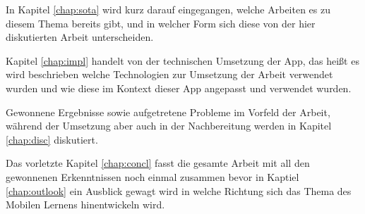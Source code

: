 In Kapitel \ref{chap:sota} wird kurz darauf eingegangen, welche Arbeiten es zu diesem Thema bereits 
gibt, und in welcher Form sich diese von der hier diskutierten Arbeit unterscheiden. 

Kapitel \ref{chap:impl} handelt von der technischen Umsetzung der App, das heißt es wird 
beschrieben welche Technologien zur Umsetzung der Arbeit verwendet wurden und wie diese im 
Kontext dieser App angepasst und verwendet wurden.

Gewonnene Ergebnisse sowie aufgetretene Probleme im Vorfeld der Arbeit, während der Umsetzung aber auch in der Nachbereitung
werden in Kapitel \ref{chap:disc} diskutiert.

Das vorletzte Kapitel \ref{chap:concl} fasst die gesamte Arbeit mit all den gewonnenen Erkenntnissen
noch einmal zusammen bevor in Kaptiel \ref{chap:outlook} ein Ausblick gewagt wird in welche 
Richtung sich das Thema des Mobilen Lernens hinentwickeln wird.



